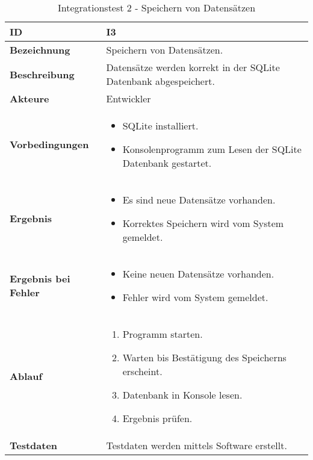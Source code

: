 \begin{table}[H]
    \begin{tabularx}{\textwidth}{ | p{} | p{} |} \hline
        \rowcolor{gray!50}
        \textbf{ID} & \textbf{I3}\\ \hline
        \textbf{Bezeichnung} & 
        Speichern von Datensätzen.\\ \hline
        \textbf{Beschreibung} & 
        Datensätze werden korrekt in der SQLite Datenbank abgespeichert.\\ \hline
        \textbf{Akteure} &
        Entwickler\\ \hline
        \textbf{Vorbedingungen} &
        \begin{itemize}
            \item SQLite installiert.
            \item Konsolenprogramm zum Lesen der SQLite Datenbank gestartet.
        \end{itemize}\\ \hline
        \textbf{Ergebnis} &        
        \begin{itemize}
            \item Es sind neue Datensätze vorhanden.
            \item Korrektes Speichern wird vom System gemeldet.
        \end{itemize}\\ \hline
        \textbf{Ergebnis bei Fehler} &
        \begin{itemize}
            \item Keine neuen Datensätze vorhanden.
            \item Fehler wird vom System gemeldet.
        \end{itemize}\\ \hline
        \textbf{Ablauf} &
        \begin{enumerate}
            \item Programm starten.
            \item Warten bis Bestätigung des Speicherns erscheint.
            \item Datenbank in Konsole lesen.
            \item Ergebnis prüfen.
        \end{enumerate}\\ \hline
        \textbf{Testdaten} &
        Testdaten werden mittels Software erstellt.\\ \hline
    \end{tabularx}
    \caption{Integrationstest 2 - Speichern von Datensätzen}
    \label{tab:inttest3}
\end{table}

